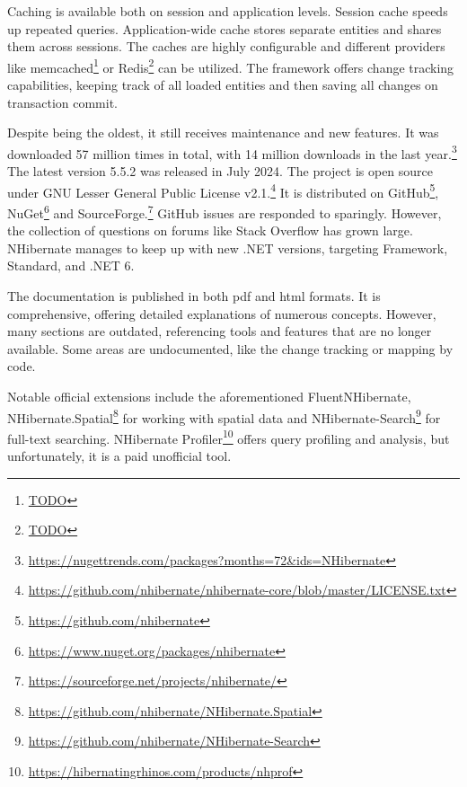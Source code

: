 Caching is available both on session and application levels. Session cache speeds up repeated queries. Application-wide cache stores separate entities and shares them across sessions. The caches are highly configurable and different providers like memcached\footnote{\url{TODO}} or Redis\footnote{\url{TODO}} can be utilized.
The framework offers change tracking capabilities, keeping track of all loaded entities and then saving all changes on transaction commit.

Despite being the oldest, it still receives maintenance and new features. It was downloaded 57 million times in total, with 14 million downloads in the last year.\footnote{\url{https://nugettrends.com/packages?months=72&ids=NHibernate}} The latest version 5.5.2 was released in July 2024. The project is open source under GNU Lesser General Public License v2.1.\footnote{\url{https://github.com/nhibernate/nhibernate-core/blob/master/LICENSE.txt}} It is distributed on GitHub\footnote{\url{https://github.com/nhibernate}}, NuGet\footnote{\url{https://www.nuget.org/packages/nhibernate}} and SourceForge.\footnote{\url{https://sourceforge.net/projects/nhibernate/}} GitHub issues are responded to sparingly. However, the collection of questions on forums like Stack Overflow has grown large. NHibernate manages to keep up with new .NET versions, targeting Framework, Standard, and .NET 6.

The documentation is published in both \acrshort{pdf} and \acrshort{html} formats. It is comprehensive, offering detailed explanations of numerous concepts. However, many sections are outdated, referencing tools and features that are no longer available. Some areas are undocumented, like the change tracking or mapping by code.

Notable official extensions include the aforementioned FluentNHibernate, {NHibernate.Spatial}\footnote{\url{https://github.com/nhibernate/NHibernate.Spatial}} for working with spatial data and NHibernate-Search\footnote{\url{https://github.com/nhibernate/NHibernate-Search}} for full-text searching. NHibernate Profiler\footnote{\url{https://hibernatingrhinos.com/products/nhprof}} offers query profiling and analysis, but unfortunately, it is a paid unofficial tool. 


